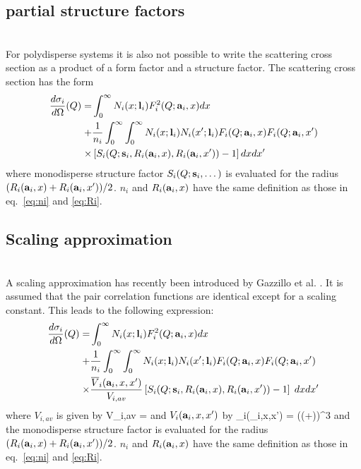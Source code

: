 \subsection{partial structure factors}
\label{sec:SQpartial}
~\\

For polydisperse systems it is also not possible to write the scattering cross section as a
product of a form factor and a structure factor. The scattering cross section has the form
\begin{align}
\frac{d\sigma_i}{d\Omega}(Q) =
&\int_0^\infty N_i(x;\B{l}_i) F_i^2(Q;\B{a}_i,x) dx \\
+ & \frac{1}{n_i}\int_0^\infty\int_0^\infty N_i(x;\B{l}_i)N_i(x';\B{l}_i)F_i(Q;\B{a}_i,x)F_i(Q;\B{a}_i,x') \nonumber \\
\times & \left[S_i(Q;\B{s}_i,R_i(\B{a}_i,x),R_i(\B{a}_i,x'))-1\right] dx dx' \nonumber
\end{align}
where monodisperse structure factor $S_i(Q;\B{s}_i,\dots)$
is evaluated for the radius
$(R_i(\B{a}_i,x)+R_i(\B{a}_i,x'))/2$. $n_i$ and $R_i(\B{a}_i,x)$ have the same
definition as those in eq.\ \ref{eq:ni} and \ref{eq:Ri}.

\subsection{Scaling approximation}
\label{sec:SQscaling}
~\\

A scaling approximation has recently been introduced by Gazzillo
et al. \cite{Gazzillo1999}. It is assumed that the pair correlation functions
are identical except for a scaling constant. This leads to the
following expression:
\begin{align}
\frac{d\sigma_i}{d\Omega}(Q) =
 &\int_0^\infty N_i(x;\B{l}_i) F_i^2(Q;\B{a}_i,x) dx \\
+ & \frac{1}{n_i}\int_0^\infty\int_0^\infty
N_i(x;\B{l}_i) N_i(x';\B{l}_i) F_i(Q;\B{a}_i,x) F_i(Q;\B{a}_i,x') \nonumber \\
\times & \frac{\overline{V}_i(\B{a}_i,x,x')}{V_{i,av}}
\left[S_i(Q;\B{s}_i,R_i(\B{a}_i,x),R_i(\B{a}_i,x'))-1\right] \;dx
dx' \nonumber
\end{align}
where $V_{i,av}$ is given by
\BE
V_{i,av} = 
\EE
and $V_i(\B{a}_i,x,x')$ by
\BE
{}_i(_i,x,x') = \pi \left(\left(+\right)\right)^3
\EE
and the monodisperse structure factor is evaluated for the radius
$(R_i(\B{a}_i,x)+R_i(\B{a}_i,x'))/2$. $n_i$ and $R_i(\B{a}_i,x)$ have the same
definition as those in eq.\ \ref{eq:ni} and \ref{eq:Ri}.

